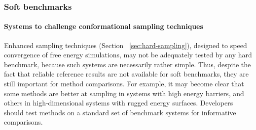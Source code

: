 \documentclass[aps,pre,twocolumn,nofootinbib,superscriptaddress,10pt, final,tightenlines]{revtex4-1}
\begin{document}
\subsubsection{Soft benchmarks}
\paragraph{Systems to challenge conformational sampling techniques}
Enhanced sampling techniques (Section ~\ref{sec:hard-sampling}), designed to speed convergence of free energy simulations,
may not be adequately tested by any hard benchmark, because such systems are necessarily rather simple. 
Thus, despite the fact that reliable reference results are not available for soft benchmarks, they are still important for method comparisons. 
For example, it may become clear that some methods are better at sampling in systems with high energy barriers, and others in high-dimensional systems with rugged energy surfaces. 
Developers should test methods on a standard set of benchmark systems for informative comparisons.
\end{document}
